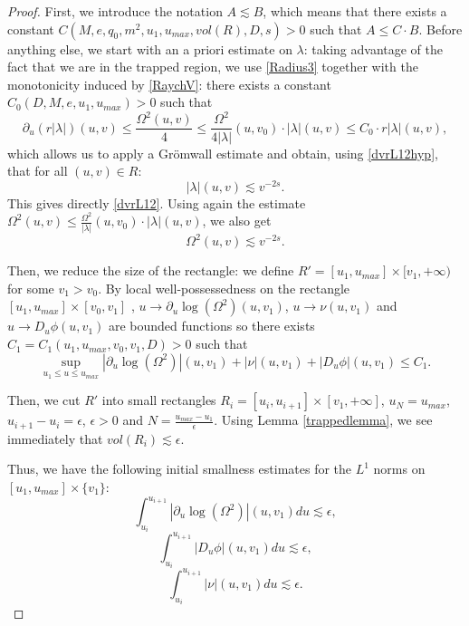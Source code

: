\documentclass[10pt,a4paper]{article}
\theoremstyle{plain}
\theoremstyle{remark}
\theoremstyle{definition}
\theoremstyle{plain}
\theoremstyle{remark}
\theoremstyle{definition}
\newcommand{\uu}{u_{max}}
\numberwithin{equation}{section}
\begin{document}
\begin{proof} First, we introduce the notation $A \lesssim B$, which means that there exists a constant $C(M,e,q_0,m^2,u_1,\uu,vol(R),D,s)>0$ such that $A \leq C \cdot B$. Before anything else, we start with an a priori estimate on $\lambda$: taking advantage of the fact that we are in the trapped region, we use \eqref{Radius3} together with the monotonicity induced by \eqref{RaychV}: there exists a constant $C_0(D,M,e,u_1,\uu)>0$ such that $$ \partial_u(r|\lambda|)(u,v)\leq \frac{\Omega^2(u,v)}{4} \leq \frac{\Omega^2}{4|\lambda|}(u,v_0) \cdot |\lambda|(u,v) \leq C_0 \cdot r |\lambda|(u,v) ,$$
	which allows us to apply a Gr\"{o}mwall estimate and obtain, using \eqref{dvrL12hyp}, that for all $(u,v) \in R$: \begin{equation} \label{lambdaglobal}
	|\lambda|(u,v) \lesssim v^{-2s}.
	\end{equation} This gives directly \eqref{dvrL12}. Using again the estimate $\Omega^2(u,v) \leq \frac{\Omega^2}{|\lambda|}(u,v_0) \cdot |\lambda|(u,v) $, we also get \begin{equation} \label{Omegaglobal}
	\Omega^2(u,v) \lesssim v^{-2s}.
	\end{equation} 
	
	Then, we reduce the size of the rectangle: we define $R'=[u_1,\uu] \times [v_1,+\infty)$ for some $v_1>v_0$. By local well-possessedness on the rectangle $[u_1,\uu] \times [v_0,v_1]$ , $u \rightarrow \partial_u \log(\Omega^2)(u,v_1)$, $u \rightarrow \nu(u,v_1)$ and $u \rightarrow D_u \phi(u,v_1)$ are bounded functions so there exists $C_1=C_1(u_1,\uu,v_0,v_1,D)>0$ such that $$ \sup_{u_1 \leq u \leq \uu}|\partial_u \log(\Omega^2)|(u,v_1)+ |\nu|(u,v_1)+|D_u \phi|(u,v_1) \leq C_1.$$
	
	Then, we cut $R'$ into small rectangles $R_i=[u_i,u_{i+1}] \times [v_1,+\infty]$, $u_N=\uu$, $u_{i+1}-u_i=\epsilon$, $\epsilon>0$ and $N=\frac{\uu-u_1}{\epsilon}$. Using Lemma \ref{trappedlemma}, we see immediately that $vol(R_i) \lesssim \epsilon$.
	
	
	
	
	Thus, we have the following initial smallness estimates for the $L^1$ norms on $[u_1,\uu] \times \{v_1\}$: \begin{equation} \label{dulogomegaL12hypsmall}
	\int_{u_i}^{u_{i+1}}|\partial_u \log(\Omega^2)|(u,v_1)du  \lesssim \epsilon,
	\end{equation} 	\begin{equation} \label{duphiL12hypsmall}
	\int_{u_i}^{u_{i+1}} |D_u \phi|(u,v_1)du \lesssim \epsilon,
	\end{equation} 	\begin{equation} \label{durL12hypsmall}
	\int_{u_i}^{u_{i+1}} |\nu|(u,v_1)du  \lesssim \epsilon.
	\end{equation}
	

\end{proof}
\end{document}
